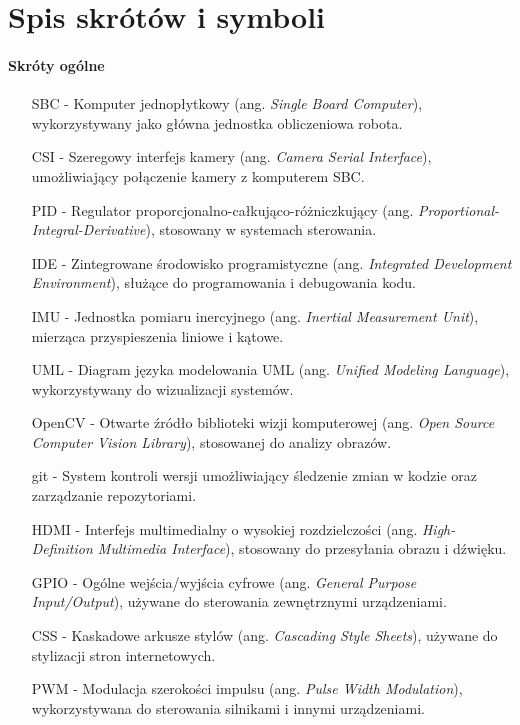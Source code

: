\chapter{Spis skrótów i symboli}

\subsubsection*{Skróty ogólne}

\begin{itemize}
    \item[SBC] - Komputer jednopłytkowy (ang. \textit{Single Board Computer}), wykorzystywany jako główna jednostka obliczeniowa robota.
    \item[CSI] - Szeregowy interfejs kamery (ang. \textit{Camera Serial Interface}), umożliwiający połączenie kamery z komputerem SBC.
    \item[PID] - Regulator proporcjonalno-całkująco-różniczkujący (ang. \textit{Proportional-Integral-Derivative}), stosowany w systemach sterowania.
    \item[IDE] - Zintegrowane środowisko programistyczne (ang. \textit{Integrated Development Environment}), służące do programowania i debugowania kodu.
    \item[IMU] - Jednostka pomiaru inercyjnego (ang. \textit{Inertial Measurement Unit}), mierząca przyspieszenia liniowe i kątowe.
    \item[UML] - Diagram języka modelowania UML (ang. \textit{Unified Modeling Language}), wykorzystywany do wizualizacji systemów.
    \item[OpenCV] - Otwarte źródło biblioteki wizji komputerowej (ang. \textit{Open Source Computer Vision Library}), stosowanej do analizy obrazów.
    \item[git] - System kontroli wersji umożliwiający śledzenie zmian w kodzie oraz zarządzanie repozytoriami.
    \item[HDMI] - Interfejs multimedialny o wysokiej rozdzielczości (ang. \textit{High-Definition Multimedia Interface}), stosowany do przesyłania obrazu i dźwięku.
    \item[GPIO] - Ogólne wejścia/wyjścia cyfrowe (ang. \textit{General Purpose Input/Output}), używane do sterowania zewnętrznymi urządzeniami.
    \item[CSS] - Kaskadowe arkusze stylów (ang. \textit{Cascading Style Sheets}), używane do stylizacji stron internetowych.
    \item[PWM] - Modulacja szerokości impulsu (ang. \textit{Pulse Width Modulation}), wykorzystywana do sterowania silnikami i innymi urządzeniami.

\end{itemize}
